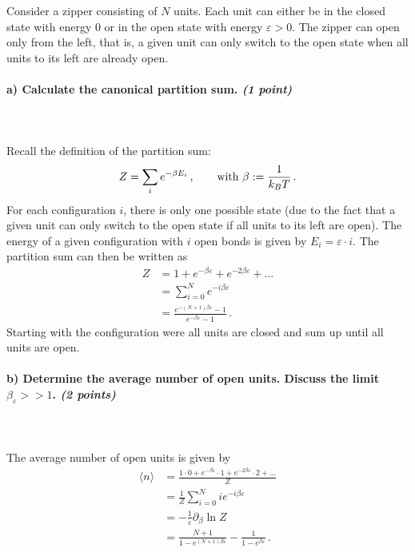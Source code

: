 Consider a zipper consisting of $N$ units. Each unit can either be in the 
closed state with energy 0 or in the open state with energy $\varepsilon>0$.
The zipper can open only from the left, that is, a given unit can only switch
to the open state when all units to its left are already open.

\paragraph{a) Calculate the canonical partition sum. \textit{(1 point)}} \ \\
    \\
    Recall the definition of the partition sum:
    \begin{equation}
        Z=\sum_i e^{-\beta E_i}
        \,, \ \ \ \ \ \ \textnormal{with }
        \beta:=\frac{1}{k_BT} \,.
    \end{equation}
    For each configuration $i$, there is only one possible state 
    (due to the fact that a given unit can only switch to the open state if 
    all units to its left are open). The energy of a given configuration
    with $i$ open bonds is given by $E_i=\varepsilon\cdot i$. The 
    partition sum can then be written as
    \begin{align}
        Z
        &=1+e^{-\beta\varepsilon}+e^{-2\beta\varepsilon}+... \\
        &=\sum_{i=0}^N e^{-i\beta\varepsilon} \\
        &=\frac{e^{-(N+1)\beta\varepsilon} - 1}{e^{-\beta\varepsilon} - 1} \,.
    \end{align}
    Starting with the configuration were all units are closed and sum up until all units
    are open.

\paragraph{b) Determine the average number of open units. Discuss the limit 
    $\beta_\varepsilon>>1$. \textit{(2 points)}} \ \\
    \\
    The average number of open units is given by
    \begin{align}
        \langle n\rangle 
        &=\frac{1\cdot 0+e^{-\beta\varepsilon}\cdot 
        1+e^{-2\beta\varepsilon}\cdot 2+...}{Z} \\
        &=\frac{1}{Z} \sum_{i=0}^N i e^{-i\beta\varepsilon} \\
        &=-\frac{1}{\varepsilon} \partial_{\beta} \ln Z \\
        &=\frac{N+1}{1-e^{(N+1)\beta\varepsilon}} - \frac{1}{1-e^{\beta\varepsilon}} \,.
    \end{align}

 
